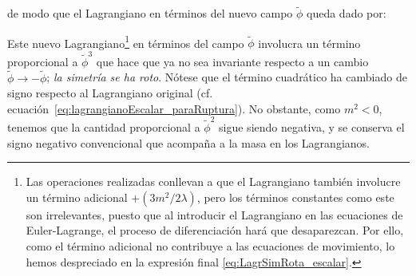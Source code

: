\noindent de modo que el Lagrangiano en términos del nuevo campo $\tilde{\phi}$  queda dado por:
%

Este nuevo Lagrangiano\footnote{Las operaciones realizadas conllevan a que el Lagrangiano también involucre un término adicional $+ (3m^2/2\lambda)$, pero los términos constantes como este son irrelevantes, puesto que al introducir el Lagrangiano en las ecuaciones de Euler-Lagrange, el proceso de diferenciación hará que desaparezcan. Por ello, como el término adicional no contribuye a las ecuaciones de movimiento, lo hemos despreciado en la expresión final \eqref{eq:LagrSimRota_escalar}.} en términos del campo $\tilde{\phi}$ involucra un término proporcional a $\tilde{\phi}^3$ que hace que ya no sea invariante respecto a un cambio $\tilde{\phi} \rightarrow -\tilde{\phi}$; \emph{la simetría se ha roto}. Nótese que el término cuadrático ha cambiado de signo respecto al Lagrangiano original (cf. ecuación~\eqref{eq:lagrangianoEscalar_paraRuptura}). No obstante, como $m^2 < 0$, tenemos que la cantidad proporcional a $\tilde{\phi}^2$ sigue siendo negativa, y se conserva el signo negativo convencional que acompaña a la masa en los Lagrangianos.




